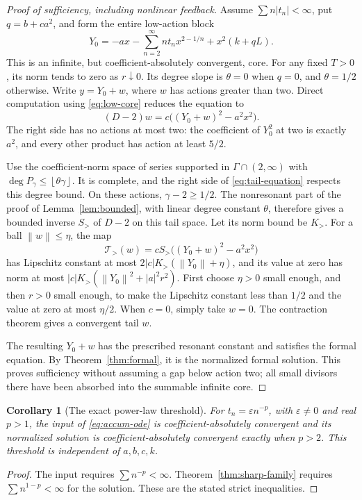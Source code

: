 \documentclass[11pt,a4paper]{article}
\numberwithin{equation}{section}
\newtheorem{corollary}[theorem]{Corollary}
\theoremstyle{definition}
\theoremstyle{remark}
\newcommand{\G}{\Gamma}
\newcommand{\norm}[1]{\left\lVert #1\right\rVert}
\newcommand{\floor}[1]{\left\lfloor #1\right\rfloor}
\begin{document}
\begin{proof}[Proof of sufficiency, including nonlinear feedback]
Assume \(\sum n|t_n|<\infty\), put \(q=b+ca^2\), and form the
entire low-action block
\begin{equation}\label{eq:low-core}
 Y_0=-a x-\sum_{n=2}^{\infty}nt_nx^{2-1/n}
                      +x^2(k+qL).
\end{equation}
This is an infinite, but coefficient-absolutely convergent, core.
For any fixed \(T>0\), its norm tends to zero as \(r\downarrow0\).
Its degree slope is \(\theta=0\) when \(q=0\), and \(\theta=1/2\)
otherwise. Write \(y=Y_0+w\), where \(w\) has actions greater than
two. Direct computation using \eqref{eq:low-core} reduces the equation
to
\begin{equation}\label{eq:tail-equation}
 (D-2)w=c\bigl((Y_0+w)^2-a^2x^2\bigr).
\end{equation}
The right side has no actions at most two: the coefficient of
\(Y_0^2\) at two is exactly \(a^2\), and every other product has
action at least \(5/2\).

Use the coefficient-norm space of series supported in
\(\G\cap(2,\infty)\) with
\(\deg P_\gamma\le\floor{\theta\gamma}\). It is complete, and the
right side of \eqref{eq:tail-equation} respects this degree bound.
On these actions, \(\gamma-2\ge1/2\). The nonresonant part of the
proof of Lemma~\ref{lem:bounded}, with linear degree constant
\(\theta\), therefore gives a bounded inverse \(S_{>}\) of
\(D-2\) on this tail space. Let its norm bound be \(K_{>}\).
For a ball \(\norm w\le\eta\), the map
\[
 \mathcal T_{>}(w)=c S_{>}
                   \bigl((Y_0+w)^2-a^2x^2\bigr)
\]
has Lipschitz constant at most
\(2|c|K_{>}(\norm{Y_0}+\eta)\), and its value at zero has norm at
most
\( |c|K_{>}(\norm{Y_0}^2+|a|^2r^2)\).
First choose \(\eta>0\) small enough, and then \(r>0\) small enough,
to make the Lipschitz constant less than \(1/2\) and the value at
zero at most \(\eta/2\). When \(c=0\), simply take \(w=0\).
The contraction theorem gives a convergent tail \(w\).

The resulting \(Y_0+w\) has the prescribed resonant constant and
satisfies the formal equation. By Theorem~\ref{thm:formal}, it is the
normalized formal solution. This proves sufficiency without assuming
a gap below action two; all small divisors there have been absorbed
into the summable infinite core.
\end{proof}

\begin{corollary}[The exact power-law threshold]\label{cor:p-threshold}
For \(t_n=\varepsilon n^{-p}\), with
\(\varepsilon\ne0\) and real \(p>1\), the input of
\eqref{eq:accum-ode} is coefficient-absolutely convergent and its
normalized solution is coefficient-absolutely convergent exactly when
\(p>2\). This threshold is independent of \(a,b,c,k\).
\end{corollary}
\begin{proof}
The input requires \(\sum n^{-p}<\infty\). Theorem~\ref{thm:sharp-family}
requires \(\sum n^{1-p}<\infty\) for the solution. These are the
stated strict inequalities.
\end{proof}
\end{document}
